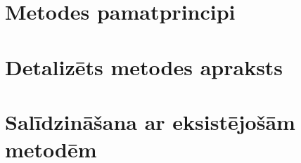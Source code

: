 ﻿\section{Metodes pamatprincipi}
\section{Detalizēts metodes apraksts}
\section{Salīdzināšana ar eksistējošām metodēm}
